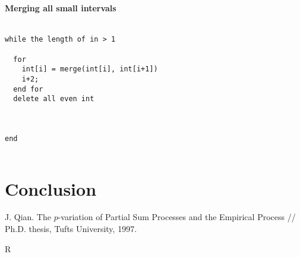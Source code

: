 \documentclass[12pt, a4paper]{article}
\numberwithin{equation}{section}
\begin{document}
\paragraph{Merging all small intervals}


\begin{lstlisting}

while the length of in > 1
  
  for  
    int[i] = merge(int[i], int[i+1])
    i+2;
  end for
  delete all even int
  
  

end 


\end{lstlisting}

\section{Conclusion}
  
\begin{thebibliography}{99}  
   J. Qian. The $p$-variation of Partial Sum Processes
  and the Empirical Process // Ph.D. thesis, Tufts University, 1997.
  
    R
  
\end{thebibliography}
\end{document}
